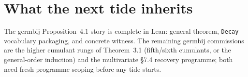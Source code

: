 \documentclass[11pt]{article}
\begin{document}
\section{What the next tide inherits}

The germbij Proposition~4.1 story is complete in Lean: general
theorem, \texttt{Decay}-vocabulary packaging, and concrete witness.
The remaining germbij commissions are the higher cumulant rungs of
Theorem~3.1 (fifth/sixth cumulants, or the general-order induction)
and the multivariate \S7.4 recovery programme; both need fresh
programme scoping before any tide starts.
\end{document}
